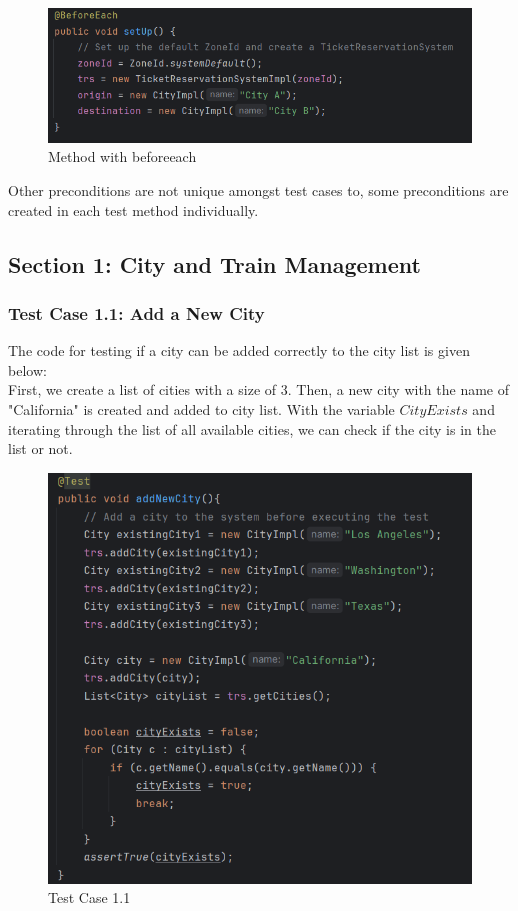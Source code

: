 \documentclass{article}
\begin{document}
\begin{figure}[h]
  \centering
  \includegraphics[width=1.0\textwidth]{pictures/T-B.png}
  \caption{Method with beforeeach}
  \label{fig:your_label}
\end{figure}

Other preconditions are not unique amongst test cases to, some preconditions are created in each test method individually.

\pagebreak

\subsection{Section 1: City and Train Management}
\subsubsection{Test Case 1.1: Add a New City}
The code for testing if a city can be added correctly to the city list is given below:\\
First, we create a list of cities with a size of 3. Then, a new city with the name of "California" is created and added to city list. With the variable $CityExists$ and iterating through the list of all available cities, we can check if the city is in the list or not.
\begin{figure}[h]
  \centering
  \includegraphics[width=1.0\textwidth]{pictures/T1-1.png}
  \caption{Test Case 1.1}
  \label{fig:your_label}
\end{figure}
\end{document}
